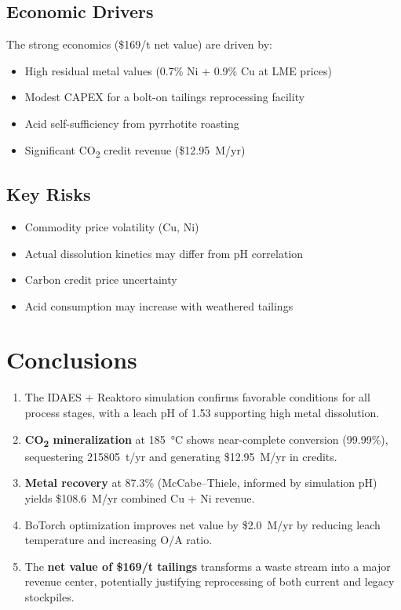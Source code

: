 \documentclass[11pt,a4paper]{article}
\begin{document}
\subsection{Economic Drivers}

The strong economics (\$169/t net value) are driven by:
\begin{itemize}
  \item High residual metal values (0.7\% Ni + 0.9\% Cu at LME prices)
  \item Modest CAPEX for a bolt-on tailings reprocessing facility
  \item Acid self-sufficiency from pyrrhotite roasting
  \item Significant CO\textsubscript{2} credit revenue (\$12.95~M/yr)
\end{itemize}

\subsection{Key Risks}

\begin{itemize}
  \item Commodity price volatility (Cu, Ni)
  \item Actual dissolution kinetics may differ from pH correlation
  \item Carbon credit price uncertainty
  \item Acid consumption may increase with weathered tailings
\end{itemize}

\section{Conclusions}
\label{sec:conclusions}

\begin{enumerate}
  \item The IDAES + Reaktoro simulation confirms favorable conditions for
        all process stages, with a leach pH of 1.53 supporting high
        metal dissolution.
  \item \textbf{CO\textsubscript{2} mineralization} at \SI{185}{\celsius}
        shows near-complete conversion (99.99\%), sequestering
        \num{215805}~t/yr and generating \$12.95~M/yr in credits.
  \item \textbf{Metal recovery} at 87.3\% (McCabe--Thiele, informed by
        simulation pH) yields \$108.6~M/yr combined Cu + Ni revenue.
  \item BoTorch optimization improves net value by \$2.0~M/yr by
        reducing leach temperature and increasing O/A ratio.
  \item The \textbf{net value of \$169/t tailings} transforms a waste
        stream into a major revenue center, potentially justifying
        reprocessing of both current and legacy stockpiles.
\end{enumerate}
\end{document}
